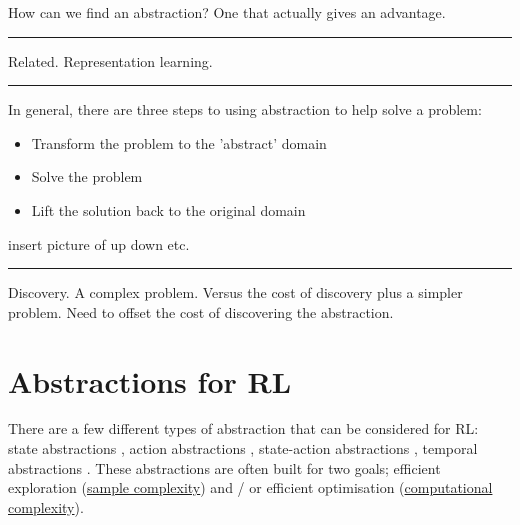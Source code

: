 How can we find an abstraction? One that actually gives an advantage.

\begin{center}\rule{0.5\linewidth}{\linethickness}\end{center}

Related. Representation learning.



\begin{center}\rule{0.5\linewidth}{\linethickness}\end{center}

%

In general, there are three steps to using abstraction to help solve a problem:

\begin{itemize}
\tightlist
  \item Transform the problem to the 'abstract' domain
  \item Solve the problem
  \item Lift the solution back to the original domain
\end{itemize}
insert picture of up down etc.

\begin{center}\rule{0.5\linewidth}{\linethickness}\end{center}

Discovery.
A complex problem. Versus the cost of discovery plus a simpler problem.
Need to offset the cost of discovering the abstraction.





\section{Abstractions for RL}

There are a few different types of abstraction that can be considered for RL:
state abstractions \cite{Littman2006,Haarnoja,Cuccu2018,Zhonga,Vezzani2019,Abel2018,Duan2018,Abel2017,Silver2016a},
action abstractions \cite{Chandak2019,Bester2019,Tennenholtz2019,Nagabandi2019}, state-action abstractions \cite{Dayan1993,Barreto2017}, temporal abstractions \cite{Rafati,Mankowitz2018,Harutyunyan2017,Fruit2017,Riemer2018,Bacon2018,Achiam2018,Pham2019,Konidaris2018,Haarnoja,Sutton1999,Fruit2017a,Bacon2016a,Jinnai2018,Nachum2018}.
These abstractions are often built for two goals; efficient exploration
(\href{https://en.wikipedia.org/wiki/Sample_complexity}{sample complexity})
and / or efficient optimisation (\href{https://en.wikipedia.org/wiki/Computational_complexity_theory}{computational complexity}).

